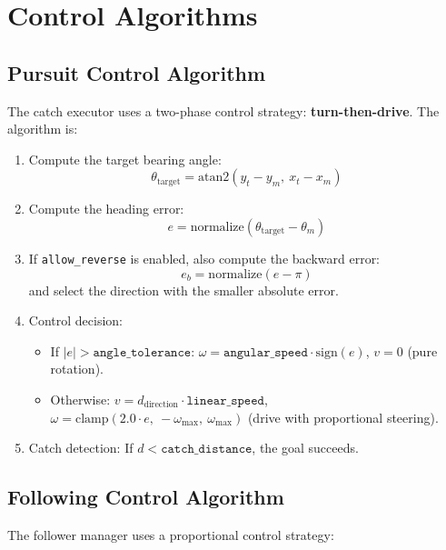 \documentclass[12pt,a4paper]{article}
\begin{document}
\section{Control Algorithms}
\label{sec:algorithms}

\subsection{Pursuit Control Algorithm}

The catch executor uses a two-phase control strategy: \textbf{turn-then-drive}. The algorithm is:

\begin{enumerate}
  \item Compute the target bearing angle:
  \[
    \theta_{\text{target}} = \text{atan2}(y_t - y_m,\ x_t - x_m)
  \]

  \item Compute the heading error:
  \[
    e = \text{normalize}(\theta_{\text{target}} - \theta_m)
  \]

  \item If \texttt{allow\_reverse} is enabled, also compute the backward error:
  \[
    e_b = \text{normalize}(e - \pi)
  \]
  and select the direction with the smaller absolute error.

  \item Control decision:
  \begin{itemize}
    \item If $|e| > \texttt{angle\_tolerance}$: $\omega = \texttt{angular\_speed} \cdot \text{sign}(e)$, $v = 0$ (pure rotation).
    \item Otherwise: $v = d_{\text{direction}} \cdot \texttt{linear\_speed}$, $\omega = \text{clamp}(2.0 \cdot e,\ -\omega_{\max},\ \omega_{\max})$ (drive with proportional steering).
  \end{itemize}

  \item Catch detection: If $d < \texttt{catch\_distance}$, the goal succeeds.
\end{enumerate}

\subsection{Following Control Algorithm}

The follower manager uses a proportional control strategy:
\end{document}
